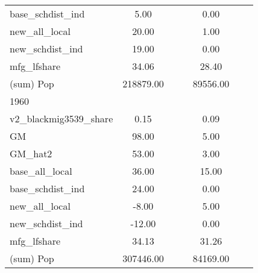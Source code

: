 \begin{table}[htbp]
\begin{tabular}{l*{2}{ccc}}
base\_schdist\_ind    &        5.00&            &            &        0.00&            &            \\
new\_all\_local       &       20.00&            &            &        1.00&            &            \\
new\_schdist\_ind     &       19.00&            &            &        0.00&            &            \\
mfg\_lfshare         &       34.06&            &            &       28.40&            &            \\
(sum) Pop           &   218879.00&            &            &    89556.00&            &            \\
\midrule
1960                &            &            &            &            &            &            \\
v2\_blackmig3539\_share&        0.15&            &            &        0.09&            &            \\
GM                  &       98.00&            &            &        5.00&            &            \\
GM\_hat2             &       53.00&            &            &        3.00&            &            \\
base\_all\_local      &       36.00&            &            &       15.00&            &            \\
base\_schdist\_ind    &       24.00&            &            &        0.00&            &            \\
new\_all\_local       &       -8.00&            &            &        5.00&            &            \\
new\_schdist\_ind     &      -12.00&            &            &        0.00&            &            \\
mfg\_lfshare         &       34.13&            &            &       31.26&            &            \\
(sum) Pop           &   307446.00&            &            &    84169.00&            &            \\
\bottomrule
\end{tabular}
\end{table}
